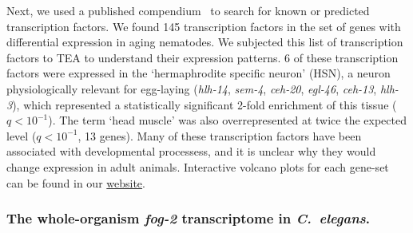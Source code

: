 \documentclass[10pt,letterpaper,twocolumn]{article}
\newcommand{\cel}{\emph{C.~elegans}}
\newcommand{\fog}{\emph{\mbox{fog-2}}}
\newcommand{\tfaging}{145}
\newcommand{\webref}{
\href{https://wormlabcaltech.github.io/Angeles_Leighton_2016/}{website}}
\newcommand{\ra}[1]{\renewcommand{\arraystretch}{#1}}
\begin{document}

Next, we used a published compendium~\cite{Reece-Hoyes2005} to search for known
or predicted transcription factors. We found \tfaging{} transcription factors in
the set of genes with differential expression in aging nematodes. We subjected
this list of transcription factors to TEA to understand their expression
patterns. 6 of these
transcription factors were expressed in the `hermaphrodite specific neuron'
(HSN), a neuron physiologically relevant for egg-laying (\emph{hlh-14}, \emph{sem-4},
\emph{ceh-20}, \emph{egl-46}, \emph{ceh-13}, \emph{hlh-3}), which represented
a statistically significant 2-fold enrichment of this tissue ($q<10^{-1}$).
The term `head muscle' was also overrepresented at twice the expected level
($q<10^{-1}$, 13 genes). Many of these transcription factors
have been  associated with developmental processess, and it is unclear why they
would change expression in adult animals. Interactive volcano plots for each
gene-set can be found in our \webref{}.

\subsubsection*{The whole-organism \fog{} transcriptome in \cel{}.}
\end{document}
